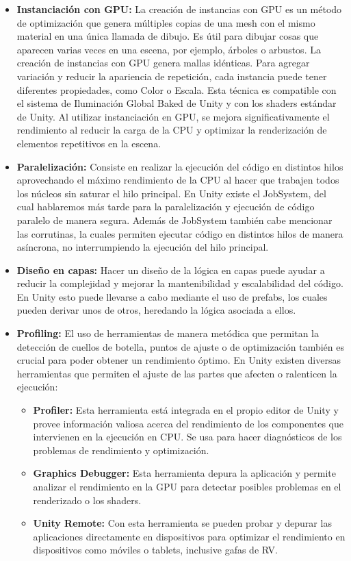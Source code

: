 \begin{itemize}
                    \item \textbf{Instanciación con GPU:} La creación de instancias con GPU es un método de optimización que genera múltiples copias de una mesh con el mismo material en una única llamada de dibujo. Es útil para dibujar cosas que aparecen varias veces en una escena, por ejemplo, árboles o arbustos.                 
                    La creación de instancias con GPU genera mallas idénticas. Para agregar variación y reducir la apariencia de repetición, cada instancia puede tener diferentes propiedades, como Color o Escala. Esta técnica es compatible con el sistema de Iluminación Global Baked de Unity y con los shaders estándar de Unity. Al utilizar instanciación en GPU, se mejora significativamente el rendimiento al reducir la carga de la CPU y optimizar la renderización de elementos repetitivos en la escena. \cite{unityGPUInstancing}
                    \item \textbf{Paralelización:} Consiste en realizar la ejecución del código en distintos hilos aprovechando el máximo rendimiento de la CPU al hacer que trabajen todos los núcleos sin saturar el hilo principal. En Unity existe el JobSystem, del cual hablaremos más tarde para la paralelización y ejecución de código paralelo de manera segura. Además de JobSystem también cabe mencionar las corrutinas, la cuales permiten ejecutar código en distintos hilos de manera asíncrona, no interrumpiendo la ejecución del hilo principal.
                    \item \textbf{Diseño en capas:} Hacer un diseño de la lógica en capas puede ayudar a reducir la complejidad y mejorar la mantenibilidad y escalabilidad del código. En Unity esto puede llevarse a cabo mediante el uso de prefabs, los cuales pueden derivar unos de otros, heredando la lógica asociada a ellos. 
                    \item \textbf{Profiling:} El uso de herramientas de manera metódica que permitan la detección de cuellos de botella, puntos de ajuste o de optimización también es crucial para poder obtener un rendimiento óptimo. En Unity existen diversas herramientas que permiten el ajuste de las partes que afecten o ralenticen la ejecución:
                    \begin{itemize}
                        \item \textbf{Profiler:} Esta herramienta está integrada en el propio editor de Unity y provee información valiosa acerca del rendimiento de los componentes que intervienen en la ejecución en CPU. Se usa para hacer diagnósticos de los problemas de rendimiento y optimización.
                        \item \textbf{Graphics Debugger:} Esta herramienta depura la aplicación y permite analizar el rendimiento en la GPU para detectar posibles problemas en el renderizado o los shaders.
                        \item \textbf{Unity Remote:} Con esta herramienta se pueden probar y depurar las aplicaciones directamente en dispositivos para optimizar el rendimiento en dispositivos como móviles o tablets, inclusive gafas de RV.
                    \end{itemize}
                \end{itemize}
